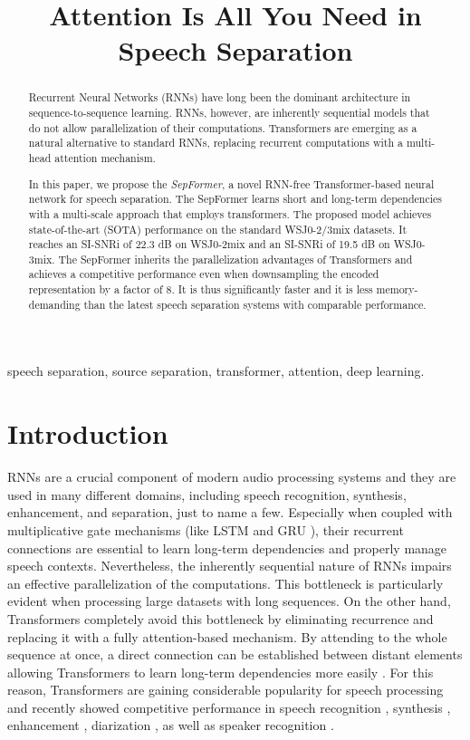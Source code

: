 \documentclass{article}
\title{Attention Is All You Need in Speech Separation}
\begin{document}
\ninept
\maketitle
\begin{abstract}
Recurrent Neural Networks (RNNs) have long been the dominant architecture in sequence-to-sequence learning. RNNs, however, are inherently sequential models that do not allow parallelization of their computations.  Transformers are emerging as a natural alternative to standard RNNs, replacing recurrent computations with a multi-head attention mechanism.

In this paper, we propose the \textit{SepFormer}, a novel RNN-free Transformer-based neural network for speech separation. The SepFormer learns short and long-term dependencies with a multi-scale approach that employs transformers. The proposed model achieves state-of-the-art (SOTA) performance on the standard WSJ0-2/3mix datasets. It reaches an SI-SNRi of 22.3 dB on WSJ0-2mix and an SI-SNRi of 19.5 dB on WSJ0-3mix. The SepFormer inherits the parallelization advantages of Transformers and achieves a competitive performance even when downsampling the encoded representation by a factor of 8. It is thus significantly faster and it is less memory-demanding than the latest speech separation systems with comparable performance.

\end{abstract}
\begin{keywords}
speech separation, source separation, transformer, attention, deep learning.
\end{keywords}
\section{Introduction}
\label{sec:intro}

RNNs are a crucial component of modern audio processing systems and they are used in many different domains, including speech recognition, synthesis, enhancement, and separation, just to name a few.
Especially when coupled with multiplicative gate mechanisms (like LSTM \cite{lstm} and GRU \cite{gru,li_gru}), their recurrent connections are essential to learn long-term dependencies and properly manage speech contexts. 
Nevertheless, the inherently sequential nature of RNNs impairs an effective parallelization of the computations.  This bottleneck is particularly evident when processing large datasets with long sequences. 
On the other hand, Transformers \cite{vaswani2017} completely avoid this bottleneck by eliminating recurrence and replacing it with a fully attention-based mechanism. By attending to the whole sequence at once, a direct connection can be established between distant elements allowing Transformers to learn long-term dependencies more easily \cite{kerg2020untangling}.
For this reason, Transformers are gaining considerable popularity for speech processing and recently showed competitive performance in speech recognition \cite{transformers_espnet}, synthesis \cite{transformers_tts}, enhancement \cite{transformers_se}, diarization \cite{transformers_diarization}, as well as speaker recognition \cite{transformers_speaker}. 
\end{document}

